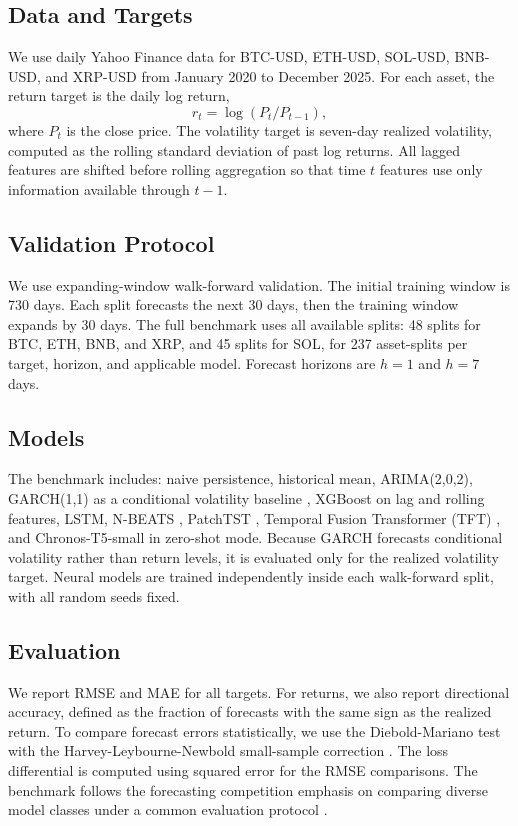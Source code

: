 \documentclass[10pt]{article}
\begin{document}
\subsection{Data and Targets}
We use daily Yahoo Finance data for BTC-USD, ETH-USD, SOL-USD, BNB-USD, and
XRP-USD from January 2020 to December 2025. For each asset, the return target
is the daily log return,
\begin{equation}
 r_t = \log(P_t/P_{t-1}),
\end{equation}
where $P_t$ is the close price. The volatility target is seven-day realized
volatility, computed as the rolling standard deviation of past log returns. All
lagged features are shifted before rolling aggregation so that time $t$
features use only information available through $t-1$.

\subsection{Validation Protocol}
We use expanding-window walk-forward validation. The initial training window is
730 days. Each split forecasts the next 30 days, then the training window
expands by 30 days. The full benchmark uses all available splits: 48 splits for
BTC, ETH, BNB, and XRP, and 45 splits for SOL, for 237 asset-splits per
target, horizon, and applicable model. Forecast horizons are $h=1$ and $h=7$
days.

\subsection{Models}
The benchmark includes: naive persistence, historical mean, ARIMA(2,0,2),
GARCH(1,1) as a conditional volatility baseline
\cite{bollerslev1986generalized}, XGBoost on lag and rolling features, LSTM,
N-BEATS \cite{oreshkin2020nbeats}, PatchTST \cite{nie2023time}, Temporal
Fusion Transformer (TFT) \cite{lim2021temporal}, and Chronos-T5-small in
zero-shot mode. Because GARCH forecasts conditional volatility rather than
return levels, it is evaluated only for the realized volatility target. Neural
models are trained independently inside each walk-forward split, with all
random seeds fixed.

\subsection{Evaluation}
We report RMSE and MAE for all targets. For returns, we also report directional
accuracy, defined as the fraction of forecasts with the same sign as the
realized return. To compare forecast errors statistically, we use the
Diebold-Mariano test \cite{diebold1995comparing} with the
Harvey-Leybourne-Newbold small-sample correction
\cite{harvey1997testing}. The loss differential is computed using squared
error for the RMSE comparisons. The benchmark follows the forecasting
competition emphasis on comparing diverse model classes under a common
evaluation protocol \cite{makridakis2020m4}.
\end{document}
